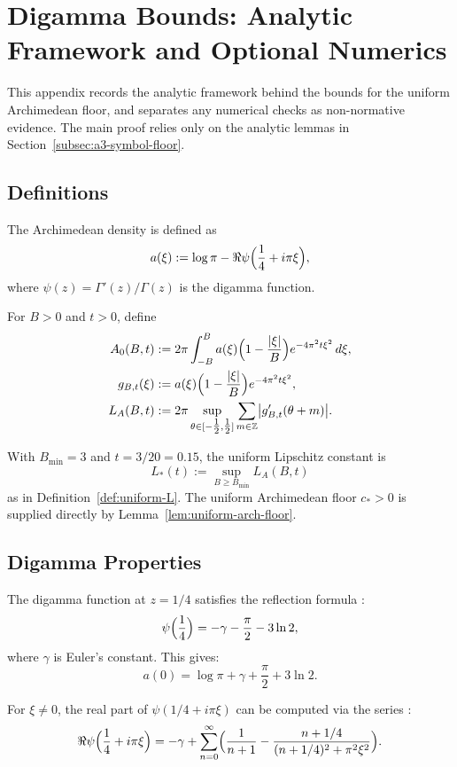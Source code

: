 \section{Digamma Bounds: Analytic Framework and Optional Numerics}\label{app:digamma-computation}

This appendix records the analytic framework behind the bounds for the uniform Archimedean floor, and separates
any numerical checks as non-normative evidence. The main proof relies only on the analytic lemmas in
Section~\ref{subsec:a3-symbol-floor}.

\subsection{Definitions}

The Archimedean density is defined as
\[
  a(\xi) := \log\pi - \Re\psi\Bigl(\frac{1}{4} + i\pi\xi\Bigr),
\]
where $\psi(z)=\Gamma'(z)/\Gamma(z)$ is the digamma function.

For $B>0$ and $t>0$, define
\begin{align}
  A_0(B,t) &:= 2\pi\int_{-B}^{B} a(\xi)\Bigl(1-\frac{|\xi|}{B}\Bigr) e^{-4\pi^2 t\xi^2}\,d\xi, \\
  g_{B,t}(\xi) &:= a(\xi)\Bigl(1-\frac{|\xi|}{B}\Bigr) e^{-4\pi^2 t\xi^2}, \\
  L_A(B,t) &:= 2\pi\sup_{\theta\in[-\tfrac12,\tfrac12]}\sum_{m\in\mathbb Z}\bigl|g_{B,t}'(\theta+m)\bigr|.
\end{align}

With $B_{\min}=3$ and $t=3/20=0.15$, the uniform Lipschitz constant is
\[
  L_*(t):=\sup_{B\ge B_{\min}}L_A(B,t)
\]
as in Definition~\ref{def:uniform-L}.  The uniform Archimedean floor $c_*>0$ is supplied
directly by Lemma~\ref{lem:uniform-arch-floor}.

\subsection{Digamma Properties}

The digamma function at $z=1/4$ satisfies the reflection formula \cite[Ch.~2]{Titchmarsh1986}:
\[
  \psi\Bigl(\frac{1}{4}\Bigr) = -\gamma - \frac{\pi}{2} - 3\ln 2,
\]
where $\gamma$ is Euler's constant. This gives:
\[
  a(0) = \log\pi + \gamma + \frac{\pi}{2} + 3\ln 2.
\]

For $\xi\ne 0$, the real part of $\psi(1/4+i\pi\xi)$ can be computed via the series \cite[Ch.~2]{Titchmarsh1986}:
\[
  \Re\psi\Bigl(\frac{1}{4}+i\pi\xi\Bigr) = -\gamma + \sum_{n=0}^{\infty}\Bigl(\frac{1}{n+1} - \frac{n+1/4}{(n+1/4)^2+\pi^2\xi^2}\Bigr).
\]

